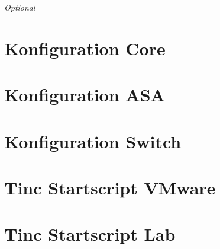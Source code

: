 \documentclass[11pt,a4paper,parskip=half]{scrartcl}
\begin{document}
\textit{Optional}

\newpage
\appendix
{}
{}
\section{Konfiguration Core}

\newpage

\section{Konfiguration ASA}

\newpage

\section{Konfiguration Switch}

\newpage

\section{Tinc Startscript VMware}
\label{app:tinc-start-esx}

\newpage

\section{Tinc Startscript Lab}
\label{app:tinc-start-lab}

\newpage
\end{document}
